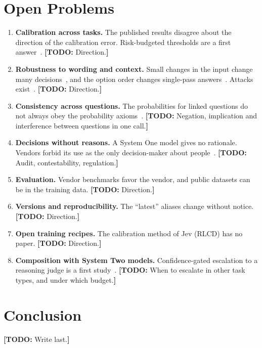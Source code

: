 \documentclass[acmsmall,nonacm,screen]{acmart}
\newcommand{\todo}[1]{{\color{red}\textbf{[TODO: }#1\textbf{]}}}
\newcommand{\sone}{System One model\xspace}
\newcommand{\stwos}{System Two models\xspace}
\begin{document}
\section{Open Problems}
\label{sec:open}
\begin{enumerate}
  \item \textbf{Calibration across tasks.} The published results disagree about the direction of the calibration error. Risk-budgeted thresholds are a first answer~\cite{messoudi2026calibration}. \todo{Direction.}
  \item \textbf{Robustness to wording and context.} Small changes in the input change many decisions~\cite{rafe2026benchmarking,xu2026jevout}, and the option order changes single-pass answers~\cite{huang2026consider}. Attacks exist~\cite{hu2026jevadvbench,lan2026decisionrobust}. \todo{Direction.}
  \item \textbf{Consistency across questions.} The probabilities for linked questions do not always obey the probability axioms~\cite{li2026beyond}. \todo{Negation, implication and interference between questions in one call.}
  \item \textbf{Decisions without reasons.} A \sone gives no rationale. Vendors forbid its use as the only decision-maker about people~\cite{microsoft2026decision1docs}. \todo{Audit, contestability, regulation.}
  \item \textbf{Evaluation.} Vendor benchmarks favor the vendor, and public datasets can be in the training data. \todo{Direction.}
  \item \textbf{Versions and reproducibility.} The ``latest'' aliases change without notice. \todo{Direction.}
  \item \textbf{Open training recipes.} The calibration method of Jev (RLCD) has no paper. \todo{Direction.}
  \item \textbf{Composition with \stwos.} Confidence-gated escalation to a reasoning judge is a first study~\cite{li2026jevasajudge}. \todo{When to escalate in other task types, and under which budget.}
\end{enumerate}

\section{Conclusion}
\label{sec:conclusion}
\todo{Write last.}
\end{document}

